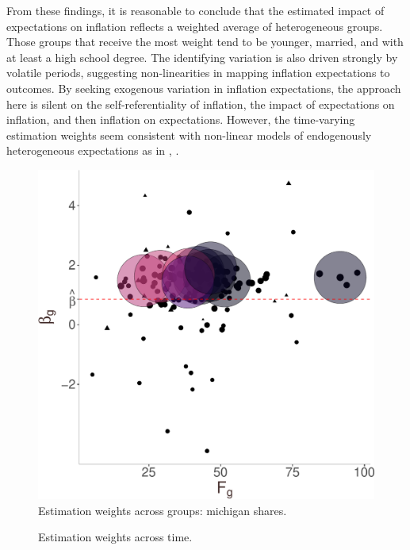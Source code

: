 \documentclass[12pt]{article}
\begin{document}
From these findings, it is reasonable to conclude that the estimated impact of expectations on inflation reflects a weighted average of heterogeneous groups. Those groups that receive the most weight tend to be younger, married, and with at least a high school degree. The identifying variation is also driven strongly by volatile periods, suggesting non-linearities in mapping inflation expectations to outcomes. By seeking exogenous variation in inflation expectations, the approach here is silent on the self-referentiality of inflation, the impact of expectations on inflation, and then inflation on expectations. However, the time-varying estimation weights seem consistent with non-linear models of endogenously heterogeneous expectations as in \cite{BranchEJ2004}, \cite{BrockHommesEconometrica1997}.




\begin{figure}
\centering
\caption{Estimation weights across groups: michigan shares.}\label{fig:rotweights:group}
\includegraphics[height=.85\textwidth, width = .85\textwidth]{figs/weightsout}
\end{figure}

\begin{figure}
\centering
\caption{Estimation weights across time.}\label{fig:rotweights:time}

\end{figure}
\end{document}
